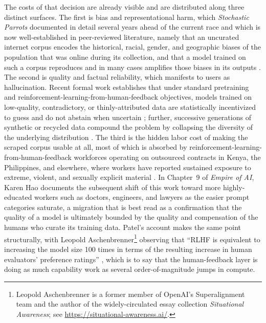 \documentclass[10pt,a4paper,twocolumn]{article}
\begin{document}
The costs of that decision are already visible and are distributed along three distinct surfaces. The first is bias and representational harm, which \emph{Stochastic Parrots} documented in detail several years ahead of the current race and which is now well-established in peer-reviewed literature, namely that an uncurated internet corpus encodes the historical, racial, gender, and geographic biases of the population that was online during its collection, and that a model trained on such a corpus reproduces and in many cases amplifies those biases in its outputs \citep{bender2021parrots}. The second is quality and factual reliability, which manifests to users as hallucination. Recent formal work establishes that under standard pretraining and reinforcement-learning-from-human-feedback objectives, models trained on low-quality, contradictory, or thinly-attributed data are statistically incentivized to guess and do not abstain when uncertain \citep{kalai2025whyhallucinate}; further, successive generations of synthetic or recycled data compound the problem by collapsing the diversity of the underlying distribution \citep{shumailov2024modelcollapse}. The third is the hidden labor cost of making the scraped corpus usable at all, most of which is absorbed by reinforcement-learning-from-human-feedback workforces operating on outsourced contracts in Kenya, the Philippines, and elsewhere, where workers have reported sustained exposure to extreme, violent, and sexually explicit material \citep[ch.~9]{hao2025empire}. In Chapter~9 of \emph{Empire of AI}, Karen Hao documents the subsequent shift of this work toward more highly-educated workers such as doctors, engineers, and lawyers as the easier prompt categories saturate, a migration that is best read as a confirmation that the quality of a model is ultimately bounded by the quality and compensation of the humans who curate its training data. Patel's account makes the same point structurally, with Leopold Aschenbrenner\footnote{Leopold Aschenbrenner is a former member of OpenAI's Superalignment team and the author of the widely-circulated essay collection \emph{Situational Awareness}; see \url{https://situational-awareness.ai/}.} observing that ``RLHF is equivalent to increasing the model size 100 times in terms of the resulting increase in human evaluators' preference ratings'' \citep[p.~35]{patel2025scaling}, which is to say that the human-feedback layer is doing as much capability work as several order-of-magnitude jumps in compute.
\end{document}
